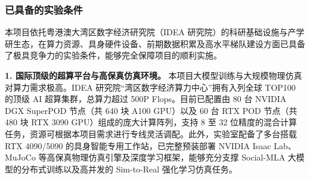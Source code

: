 





\subsubsection{已具备的实验条件}

本项目依托粤港澳大湾区数字经济研究院（IDEA 研究院）的科研基础设施与产学研生态，在算力资源、具身硬件设备、前期数据积累及高水平梯队建设方面已具备了极具竞争力的实验条件，能够完全保障项目的顺利实施。

\textbf{1. 国际顶级的超算平台与高保真仿真环境。} 
本项目大模型训练与大规模物理仿真对算力需求极高。IDEA 研究院“湾区数字经济算力中心”拥有入列全球 TOP100 的顶级 AI 超算集群，总算力超过 500P Flops。目前已配置由 80 台 NVIDIA DGX SuperPOD 节点（共 640 块 A100 GPU）以及 60 台 RTX POD 节点（共 480 块 RTX 3090 GPU）组成的庞大计算阵列，支持 8 至 32 位精度的混合计算任务，资源可根据本项目需求进行专线灵活调配。此外，实验室配备了多台搭载 RTX 4090/5090 的具身智能专用工作站，已完整预装部署 NVIDIA Isaac Lab、MuJoCo 等高保真物理仿真引擎及深度学习框架，能够充分支撑 Social-MLA 大模型的分布式训练以及高并发的 Sim-to-Real 强化学习仿真任务。

